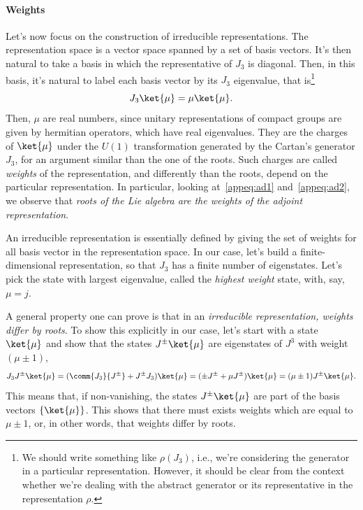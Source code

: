 \paragraph{Weights}
Let's now focus on the construction of irreducible representations. The representation space is a vector space spanned by a set of basis vectors. It's then natural to take a basis in which the representative of $J_3$ is diagonal. Then, in this basis, it's natural to label each basis vector by its $J_3$ eigenvalue, that is\footnote{We should write something like $\rho(J_3)$, i.e., we're considering the generator in a particular representation. However, it should be clear from the context whether we're dealing with the abstract generator or its representative in the representation $\rho$.}
\begin{equation}
    J_3 \ket{\mu} = \mu \ket{\mu} .
\end{equation}
Then, $\mu$ are real numbers, since unitary representations of compact groups are given by hermitian operators, which have real eigenvalues. They are the charges of $\ket{\mu}$ under the $U(1)$ transformation generated by the Cartan's generator $J_3$, for an argument similar than the one of the roots. Such charges are called \emph{weights} of the representation, and differently than the roots, depend on the particular representation. In particular, looking at~\eqref{appeq:ad1} and~\eqref{appeq:ad2}, we observe that \emph{roots of the Lie algebra are the weights of the adjoint representation}.

An irreducible representation is essentially defined by giving the set of weights for all basis vector in the representation space. In our case, let's build a finite-dimensional representation, so that $J_3$ has a finite number of eigenstates. Let's pick the state with largest eigenvalue, called the \emph{highest weight} state, with, say, $\mu = j$.

A general property one can prove is that in an \emph{irreducible representation, weights differ by roots}. To show this explicitly in our case, let's start with a state $\ket{\mu}$ and show that the states $J^\pm \ket{\mu}$ are eigenstates of $J^3$ with weight $(\mu \pm 1)$,
\begin{equation}
    J_3 J^\pm \ket{\mu} = (\comm{J_3}{J^\pm} + J^\pm J_3) \ket{\mu} = (\pm J^\pm + \mu J^\pm) \ket{\mu} = (\mu \pm 1) J^\pm \ket{\mu} .
\end{equation}
This means that, if non-vanishing, the states $J^\pm \ket{\mu}$ are part of the basis vectors $\{\ket{\mu}\}$. This shows that there must exists weights which are equal to $\mu \pm 1$, or, in other words, that weights differ by roots. 

